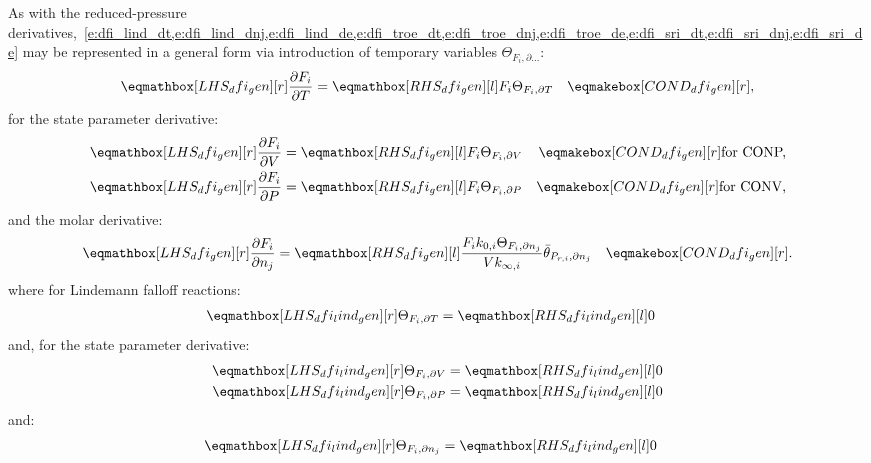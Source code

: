 \documentclass[12pt,number,sort&compress]{elsarticle}
\newcommand{\conp}{CONP}
\newcommand{\conv}{CONV}
\newcommand{\dconp}{\ifmmode\text{for \conp,}\else for \conp,\fi}
\newcommand{\dconv}{\ifmmode\text{for \conv,}\else for \conv,\fi}
\begin{document}
As with the reduced-pressure derivatives,~\cref{e:dfi_lind_dt,e:dfi_lind_dnj,e:dfi_lind_de,e:dfi_troe_dt,e:dfi_troe_dnj,e:dfi_troe_de,e:dfi_sri_dt,e:dfi_sri_dnj,e:dfi_sri_de} may be represented in a general form via introduction of temporary variables $\Theta_{F_i, \partial \ldots}$:
\begin{align}
\lhs{dfi_gen}{\frac{\partial F_{i} }{\partial T }} &= \rhs{dfi_gen}{F_{i} \Theta_{F_i, \partial T}} & \cond{dfi_gen}{,}
\end{align}
for the state parameter derivative:
\begin{subequations}
 \begin{align}
  \lhs{dfi_gen}{\frac{\partial F_{i} }{\partial V }} &= \rhs{dfi_gen}{F_{i} \Theta_{F_i, \partial V}} & \cond{dfi_gen}{\dconp} \\
  \lhs{dfi_gen}{\frac{\partial F_{i} }{\partial P }} &= \rhs{dfi_gen}{F_{i} \Theta_{F_i, \partial P}} & \cond{dfi_gen}{\dconv}
 \end{align}
\end{subequations}
and the molar derivative:
\begin{align}
 \lhs{dfi_gen}{\frac{\partial F_{i} }{\partial {n_j}}} &= \rhs{dfi_gen}{\frac{F_{i} k_{0, i} \Theta_{F_i, \partial n_j}}{V k_{\infty, i}} \bar{\theta}_{P_{r, i}, \partial n_j}} & \cond{dfi_gen}{.}
\end{align}
where for Lindemann falloff reactions:
\begin{align}
\label{e:dfi_lind_dt_prod}
\lhs{dfi_lind_gen}{\Theta_{F_i, \partial T}} &= \rhs{dfi_lind_gen}{0}
\end{align}
and, for the state parameter derivative:
\begin{subequations}
 \label{e:dfi_lind_de_prod}
 \begin{align}
  \lhs{dfi_lind_gen}{\Theta_{F_i, \partial V}} &= \rhs{dfi_lind_gen}{0} \\
  \lhs{dfi_lind_gen}{\Theta_{F_i, \partial P}} &= \rhs{dfi_lind_gen}{0}
 \end{align}
\end{subequations}
and:
\begin{align}
\label{e:dfi_lind_dnj_prod}
\lhs{dfi_lind_gen}{\Theta_{F_i, \partial n_j}} &= \rhs{dfi_lind_gen}{0}
\end{align}
\end{document}
